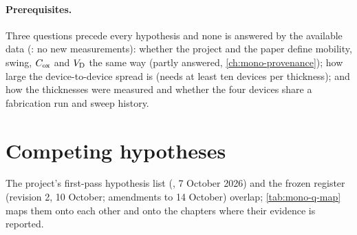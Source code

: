 \paragraph{Prerequisites.} Three questions precede every hypothesis and none is answered by the available data
(: no new measurements): whether the project and the paper define mobility, swing, $C_{\mathrm{ox}}$ and $V_{\mathrm{D}}$ the same
way (partly answered, \cref{ch:mono-provenance}); how large the device-to-device spread is (needs at least ten devices
per thickness); and how the thicknesses were measured and whether the four devices share a fabrication run and sweep
history.

\section{Competing hypotheses}
\label{sec:mono-q-hyp}

The project's first-pass hypothesis list (, 7 October 2026) and the frozen register
(revision 2, 10 October; amendments to 14 October) overlap; \cref{tab:mono-q-map} maps them onto each other and onto the
chapters where their evidence is reported.

